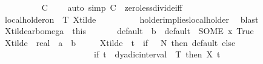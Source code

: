 \begin{isabellebody}
\ \ \ \ \ \ \ \ \isamarkupfalse%
\ {\isacartoucheopen}{\isacharquery}{\kern0pt}C\ {\isachargreater}{\kern0pt}\ {}{\isacartoucheclose}\ \isamarkupfalse%
\ {\isacharparenleft}{\kern0pt}auto\ simp{\isacharcolon}{\kern0pt}\ {\isacartoucheopen}{\isacharquery}{\kern0pt}C\ {\isachargreater}{\kern0pt}\ {}{\isacartoucheclose}zero{\isacharunderscore}{\kern0pt}less{\isacharunderscore}{\kern0pt}divide{\isacharunderscore}{\kern0pt}iff{\isacharparenright}{\kern0pt}\isanewline
\ \ \ \ \ \ \ \ \isamarkupfalse%
\isanewline
\ \ \ \ \ \ \isamarkupfalse%
\ \isamarkupfalse%
\ {\isachardoublequoteopen}local{\isacharunderscore}{\kern0pt}holder{\isacharunderscore}{\kern0pt}on\ {\isasymgamma}\ {\isacharbraceleft}{\kern0pt}{}{\isachardot}{\kern0pt}{\isachardot}{\kern0pt}T{\isacharbraceright}{\kern0pt}\ X{\isacharunderscore}{\kern0pt}tilde{\isachardoublequoteclose}\isanewline
\ \ \ \ \ \ \ \ \isamarkupfalse%
\ holder{\isacharunderscore}{\kern0pt}implies{\isacharunderscore}{\kern0pt}local{\isacharunderscore}{\kern0pt}holder\ \isamarkupfalse%
\ blast\isanewline
\ \ \ \ \isacommand{{\isacharbraceright}{\kern0pt}}\isamarkupfalse%
\ \isamarkupfalse%
\ X{\isacharunderscore}{\kern0pt}tilde{\isacharunderscore}{\kern0pt}arb{\isacharunderscore}{\kern0pt}omega\ {\isacharequal}{\kern0pt}\ this\ \isanewline
\ \ \ \ \isamarkupfalse%
\ default\ {\isacharcolon}{\kern0pt}{\isacharcolon}{\kern0pt}\ {\isacharprime}{\kern0pt}b\ \ {\isachardoublequoteopen}default\ {\isacharequal}{\kern0pt}\ {\isacharparenleft}{\kern0pt}SOME\ x{\isachardot}{\kern0pt}\ True{\isacharparenright}{\kern0pt}{\isachardoublequoteclose}\isanewline
\ \ \ \ \isamarkupfalse%
\ X{\isacharunderscore}{\kern0pt}tilde\ {\isacharcolon}{\kern0pt}{\isacharcolon}{\kern0pt}\ {\isachardoublequoteopen}real\ {\isasymRightarrow}\ {\isacharprime}{\kern0pt}a\ {\isasymRightarrow}\ {\isacharprime}{\kern0pt}b{\isachardoublequoteclose}\ \isanewline
\ \ \ \ {\isachardoublequoteopen}X{\isacharunderscore}{\kern0pt}tilde\ {\isasymequiv}\ {\isacharparenleft}{\kern0pt}{\isasymlambda}t\ {\isasymomega}{\isachardot}{\kern0pt}\ if\ {\isasymomega}\ {\isasymin}\ {\isacharquery}{\kern0pt}N\ then\ default\ else\isanewline
\ \ \ \ \ \ \ \ \ \ \ \ \ \ \ \ \ \ \ \ \ \ {\isacharparenleft}{\kern0pt}if\ t\ {\isasymin}\ dyadic{\isacharunderscore}{\kern0pt}interval\ {}\ T\ then\ X\ t\ {\isasymomega}\isanewline

\end{isabellebody}
